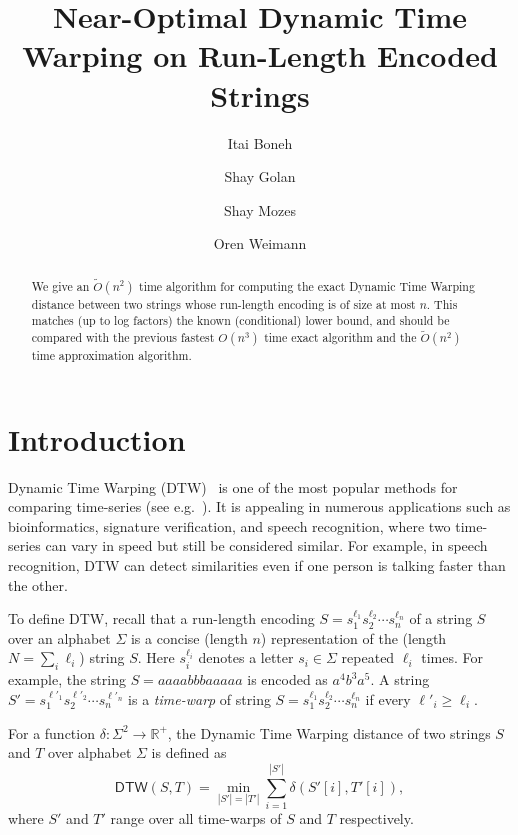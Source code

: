 \documentclass[a4paper,UKenglish,cleveref, autoref, thm-restate]{lipics-v2021}
\title{Near-Optimal Dynamic Time Warping on Run-Length Encoded Strings}
\author{Itai Boneh}{Reichman University and University of Haifa, Israel}{itai.bone@biu.ac.il}{}{}
\author{Shay Golan}{Reichman University and University of Haifa, Israel}{golansh1@macs.biu.ac.il}{https://orcid.org/0000-0001-8357-2802}{}
\author{Shay Mozes}{Reichman University, Israel}{smozes@idc.ac.il}{https://orcid.org/0000-0001-9262-1821}{}
\author{Oren Weimann}{University of Haifa, Israel}{oren@cs.haifa.ac.il}{https://orcid.org/0000-0002-4510-7552}{}
\date{}
\newcommand{\R}{\mathbb{R}}
\newcommand{\Rp}{\R^+}
\newcommand{\DTW}{\mathsf{DTW}}
\begin{document}
\maketitle
\begin{abstract}
We give an $\tilde O(n^2)$ time algorithm for computing the exact Dynamic Time Warping  distance between two strings whose run-length encoding is of size at most $n$. This matches (up to log factors) the known (conditional) lower bound, and should be compared with the previous fastest $O(n^3)$ time exact algorithm and the $\tilde O(n^2)$ time approximation algorithm.  
\end{abstract}

\section{Introduction}
\label{section:introduction}

Dynamic Time Warping (DTW)~\cite{vintzyuk1968} is one of the most popular methods for comparing time-series (see e.g.~\cite{DBLP:journals/pr/Liao05,dtwapp1,dtwapp2,dtwapp3,dtwapp4,dtwapp6,WMDTSK13,ASW15,BLBLK17}). It is appealing in numerous applications such as bioinformatics, signature verification, and speech recognition, where two time-series can vary in speed but still be considered similar. For example, in speech recognition, DTW can detect similarities even if one person is talking faster than the other.  

To define DTW, recall that a run-length encoding $S=s_1^{\ell_1} s_2^{\ell_2} \cdots s_n^{\ell_n}$ of a string $S$ over an alphabet $\Sigma$ is a concise (length $n$) representation of the (length $N=\sum_i \ell_i$) string $S$. Here $s_i^{\ell_i}$ denotes a letter $s_i\in\Sigma$ repeated $\ell_i$ times.
For example, the string $S= aaaabbbaaaaa$ is encoded as $a^4 b^3 a^5$.
A string $S'=s_1^{\ell'_1} s_2^{\ell'_2} \cdots s_n^{\ell'_n}$ is a {\em time-warp} of string $S=s_1^{\ell_1} s_2^{\ell_2} \cdots s_n^{\ell_n}$ if  every $\ell'_i \ge \ell_i$.   

\begin{definition}
	
For a function $\delta : \Sigma^2 \rightarrow \Rp$, 
 the Dynamic Time Warping distance of two strings $S$ 
and $T$ over alphabet $\Sigma$ is defined as 
$$
\DTW(S,T) =  \min_{|S'| = |T'|} \sum_{i = 1}^{|S'|} \delta(S'[i], T'[i]),
$$ where $S'$ and $T'$ range over all time-warps of $S$ and $T$ respectively. 
\end{definition}
\end{document}
